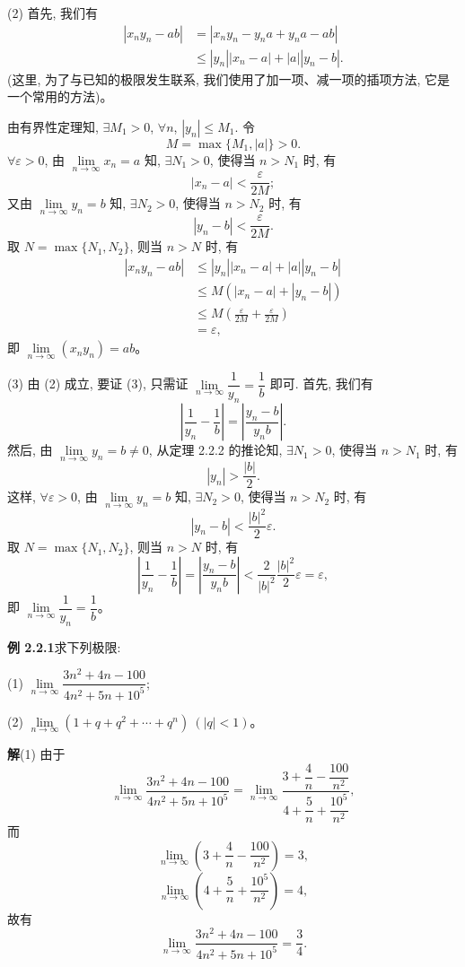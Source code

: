 \documentclass[UTF8, 12pt, fontset=fandol, oneside]{ctexart}
\begin{document}
(2) 首先, 我们有
\[
\begin{aligned}
  |x_ny_n-ab|
  &=|x_ny_n-y_na+y_na-ab|\\
  &\leqslant |y_n||x_n-a|+|a||y_n-b|.
\end{aligned}
\]
(这里, 为了与已知的极限发生联系, 我们使用了加一项、减一项的插项方法, 它是一个常用的方法)。

由有界性定理知, $\exists M_1>0$, $\forall n$, $|y_n|\leqslant M_1$. 令
\[
  M=\max\{M_1,|a|\}>0.
\]
$\forall\varepsilon>0$, 由 $\lim\limits_{n\to\infty}x_n=a$ 知, $\exists N_1>0$, 使得当 $n>N_1$ 时, 有
\[
  |x_n-a|<\frac{\varepsilon}{2M};
\]
又由 $\lim\limits_{n\to\infty}y_n=b$ 知, $\exists N_2>0$, 使得当 $n>N_2$ 时, 有
\[
  |y_n-b|<\frac{\varepsilon}{2M}.
\]
取 $N=\max\{N_1,N_2\}$, 则当 $n>N$ 时, 有
\[
\begin{aligned}
  |x_ny_n-ab|
  &\leqslant |y_n||x_n-a|+|a||y_n-b|\\
  &\leqslant M(|x_n-a|+|y_n-b|)\\
  &\leqslant M\left(\frac{\varepsilon}{2M}+\frac{\varepsilon}{2M}\right)\\
  &=\varepsilon,
\end{aligned}
\]
即 $\lim\limits_{n\to\infty}(x_ny_n)=ab$。

(3) 由 (2) 成立, 要证 (3), 只需证 $\lim\limits_{n\to\infty}\dfrac1{y_n}=\dfrac1b$ 即可. 首先, 我们有
\[
  \left|\frac1{y_n}-\frac1b\right|
  =
  \left|\frac{y_n-b}{y_nb}\right|.
\]
然后, 由 $\lim\limits_{n\to\infty}y_n=b\ne0$, 从定理 2.2.2 的推论知, $\exists N_1>0$, 使得当 $n>N_1$ 时, 有
\[
  |y_n|>\frac{|b|}{2}.
\]
这样, $\forall\varepsilon>0$, 由 $\lim\limits_{n\to\infty}y_n=b$ 知, $\exists N_2>0$, 使得当 $n>N_2$ 时, 有
\[
  |y_n-b|<\frac{|b|^2}{2}\varepsilon.
\]
取 $N=\max\{N_1,N_2\}$, 则当 $n>N$ 时, 有
\[
  \left|\frac1{y_n}-\frac1b\right|
  =
  \left|\frac{y_n-b}{y_nb}\right|
  <
  \frac2{|b|^2}\frac{|b|^2}{2}\varepsilon
  =
  \varepsilon,
\]
即 $\lim\limits_{n\to\infty}\dfrac1{y_n}=\dfrac1b$。

\noindent\textbf{例 2.2.1}\quad 求下列极限:

(1) $\lim\limits_{n\to\infty}\dfrac{3n^2+4n-100}{4n^2+5n+10^5}$;

(2) $\lim\limits_{n\to\infty}(1+q+q^2+\cdots+q^n)\ (|q|<1)$。

\noindent\textbf{解}\quad (1) 由于
\[
  \lim_{n\to\infty}\frac{3n^2+4n-100}{4n^2+5n+10^5}
  =
  \lim_{n\to\infty}
  \frac{3+\dfrac4n-\dfrac{100}{n^2}}
       {4+\dfrac5n+\dfrac{10^5}{n^2}},
\]
而
\[
  \lim_{n\to\infty}\left(3+\frac4n-\frac{100}{n^2}\right)=3,
\]
\[
  \lim_{n\to\infty}\left(4+\frac5n+\frac{10^5}{n^2}\right)=4,
\]
故有
\[
  \lim_{n\to\infty}\frac{3n^2+4n-100}{4n^2+5n+10^5}=\frac34.
\]
\end{document}
